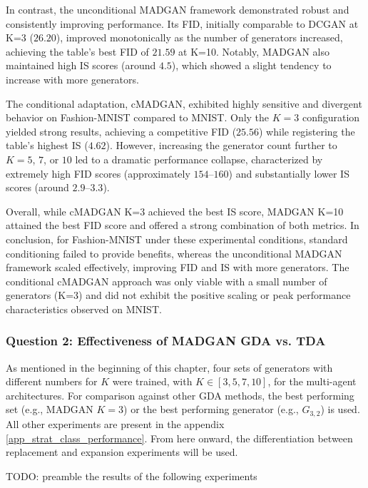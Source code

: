 In contrast, the unconditional MADGAN framework demonstrated robust and consistently improving performance. Its FID, initially comparable to DCGAN at K=3 ($26.20$), improved monotonically as the number of generators increased, achieving the table's best FID of $21.59$ at K=10. Notably, MADGAN also maintained high IS scores (around $4.5$), which showed a slight tendency to increase with more generators.

The conditional adaptation, cMADGAN, exhibited highly sensitive and divergent behavior on Fashion-MNIST compared to MNIST. Only the $K = 3$ configuration yielded strong results, achieving a competitive FID ($25.56$) while registering the table's highest IS ($4.62$). However, increasing the generator count further to $K = 5$, $7$, or $10$ led to a dramatic performance collapse, characterized by extremely high FID scores (approximately $154$–$160$) and substantially lower IS scores (around $2.9$–$3.3$).

Overall, while cMADGAN K=3 achieved the best IS score, MADGAN K=10 attained the best FID score and offered a strong combination of both metrics. In conclusion, for Fashion-MNIST under these experimental conditions, standard conditioning failed to provide benefits, whereas the unconditional MADGAN framework scaled effectively, improving FID and IS with more generators. The conditional cMADGAN approach was only viable with a small number of generators (K=3) and did not exhibit the positive scaling or peak performance characteristics observed on MNIST.

\subsubsection[Question 2]{Question 2: Effectiveness of MADGAN GDA vs. TDA}\label{exp_results_ans_q2}
 As mentioned in the beginning of this chapter, four sets of generators with different numbers for \(K\) were trained, with \(K \in [3, 5, 7, 10]\), for the multi-agent architectures. For comparison against other GDA methods, the best performing set (e.g., MADGAN \(K=3\)) or the best performing generator (e.g., \(G_{3,2}\)) is used. All other experiments are present in the appendix \ref{app_strat_class_performance}. From here onward, the differentiation between replacement and expansion experiments will be used.


TODO: preamble the results of the following experiments


